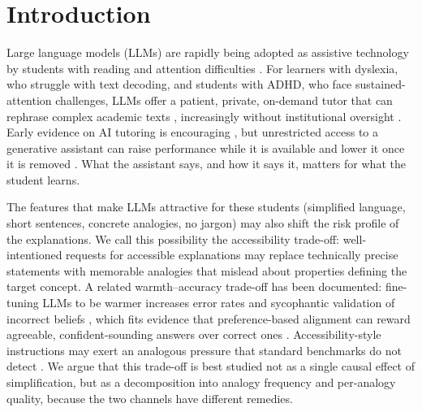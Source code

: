 \documentclass[journal,article,submit,pdftex,moreauthors]{Definitions/mdpi}
\begin{document}
\section{Introduction}

Large language models (LLMs) are rapidly being adopted as assistive technology by students with reading and attention difficulties \cite{zdravkova2022cutting, kortemeyer2023ai, kasneci2023chatgpt}. For learners with dyslexia, who struggle with text decoding, and students with ADHD, who face sustained-attention challenges, LLMs offer a patient, private, on-demand tutor that can rephrase complex academic texts \cite{rello2013good, stajner2021automatic}, increasingly without institutional oversight \cite{finnieansley2022robots, prather2023robots, denny2024computing}. Early evidence on AI tutoring is encouraging \cite{pardos2024chatgpt, kestin2025ai}, but unrestricted access to a generative assistant can raise performance while it is available and lower it once it is removed \cite{bastani2025generative}. What the assistant says, and how it says it, matters for what the student learns.

The features that make LLMs attractive for these students (simplified language, short sentences, concrete analogies, no jargon) may also shift the risk profile of the explanations. We call this possibility the accessibility trade-off: well-intentioned requests for accessible explanations may replace technically precise statements with memorable analogies that mislead about properties defining the target concept. A related warmth--accuracy trade-off has been documented: fine-tuning LLMs to be warmer increases error rates and sycophantic validation of incorrect beliefs \cite{ibrahim2026warmth}, which fits evidence that preference-based alignment can reward agreeable, confident-sounding answers over correct ones \cite{ouyang2022training, sharma2024towards, perez2023discovering}. Accessibility-style instructions may exert an analogous pressure that standard benchmarks do not detect \cite{lin2022truthfulqa}. We argue that this trade-off is best studied not as a single causal effect of simplification, but as a decomposition into analogy frequency and per-analogy quality, because the two channels have different remedies.
\end{document}
